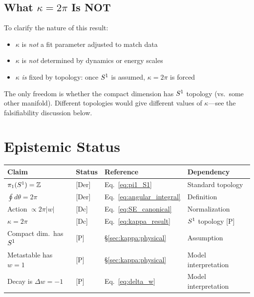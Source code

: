 \subsection{What $\kappa = 2\pi$ Is NOT}

To clarify the nature of this result:
\begin{itemize}
    \item $\kappa$ is \emph{not} a fit parameter adjusted to match data
    \item $\kappa$ is \emph{not} determined by dynamics or energy scales
    \item $\kappa$ \emph{is} fixed by topology: once $S^1$ is assumed,
          $\kappa = 2\pi$ is forced
\end{itemize}

The only freedom is whether the compact dimension has $S^1$ topology (vs.\
some other manifold). Different topologies would give different values of
$\kappa$---see the falsifiability discussion below.

\section{Epistemic Status}
\label{sec:kappa:epistemic}

\begin{center}
\begin{tabular}{llll}
\toprule
\textbf{Claim} & \textbf{Status} & \textbf{Reference} & \textbf{Dependency} \\
\midrule
$\pi_1(S^1) = \mathbb{Z}$ & [Der] & Eq.~\eqref{eq:pi1_S1} & Standard topology \\
$\oint d\theta = 2\pi$ & [Der] & Eq.~\eqref{eq:angular_integral} & Definition \\
Action $\propto 2\pi |w|$ & [Dc] & Eq.~\eqref{eq:SE_canonical} & Normalization \\
$\kappa = 2\pi$ & [Dc] & Eq.~\eqref{eq:kappa_result} & $S^1$ topology [P] \\
\midrule
Compact dim.\ has $S^1$ & [P] & \S\ref{sec:kappa:physical} & Assumption \\
Metastable has $w = 1$ & [P] & \S\ref{sec:kappa:physical} & Model interpretation \\
Decay is $\Delta w = -1$ & [P] & Eq.~\eqref{eq:delta_w} & Model interpretation \\
\bottomrule
\end{tabular}
\end{center}

